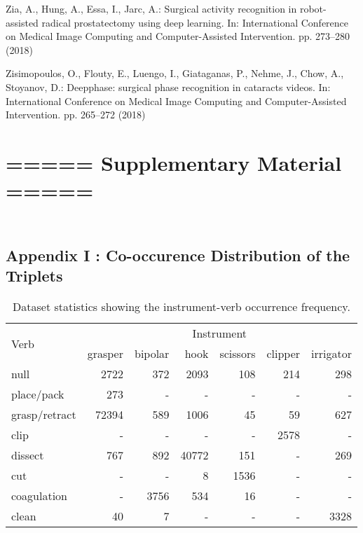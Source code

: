 \documentclass[english,runningheads,a4paper]{llncs}
\begin{document}
\begin{thebibliography}{10}
Zia, A., Hung, A., Essa, I., Jarc, A.: Surgical activity recognition in
  robot-assisted radical prostatectomy using deep learning. In: International
  Conference on Medical Image Computing and Computer-Assisted Intervention. pp.
  273--280 (2018)

Zisimopoulos, O., Flouty, E., Luengo, I., Giataganas, P., Nehme, J., Chow, A.,
  Stoyanov, D.: Deepphase: surgical phase recognition in cataracts videos. In:
  International Conference on Medical Image Computing and Computer-Assisted
  Intervention. pp. 265--272 (2018)

\end{thebibliography} 
\clearpage
\section*{\centering ===== Supplementary Material =====}

\subsection*{\\ Appendix I : Co-occurence Distribution  of  the  Triplets}


\begin{table}[!htbp]
\begin{center}
\vspace{-4mm}
\begin{tabular}{l@{\hskip 0.1in}|@{\hskip 0.1in}r@{\hskip 0.1in}r@{\hskip 0.1in}r@{\hskip 0.1in}r@{\hskip 0.1in}r@{\hskip 0.1in}r}
\multirow{2}{*}{Verb} & \multicolumn{6}{c}{Instrument}   \\ \cline{2-7} & grasper  & bipolar  & hook & scissors & clipper  & irrigator \\ \hline
null & 2722  & 372 & 2093 &  108 &  214 &  298 \\
place/pack & 273  &   -  &   -   &  -  &   -  &   - \\
grasp/retract & 72394  & 589 & 1006 &   45  &  59 &  627 \\
clip  &    -  &   -   &  - &  - & 2578 &    - \\
dissect &  767 &  892 & 40772 &  151  &   - &  269 \\
cut  &    -  &   - &    8 & 1536  &   - &   -\\
coagulation  &   - & 3756  & 534 &   16   &  -   & - \\
clean &   40  &   7  &   -  &   -  &  - & 3328 \\
\end{tabular}
\end{center}
\caption{Dataset statistics showing the instrument-verb occurrence frequency.}
\label{table:data_stat1}
\vspace{-4mm}
\end{table}
\end{document}
